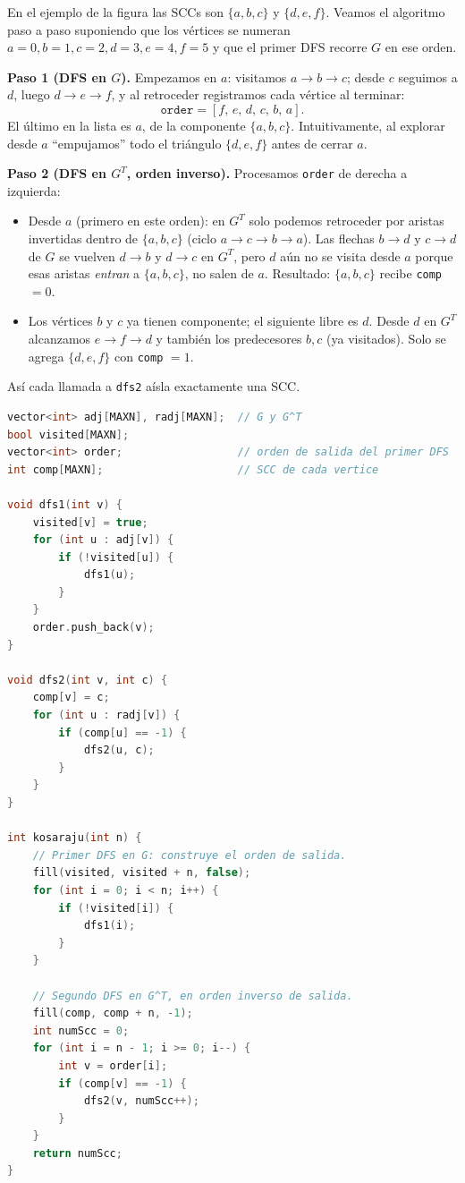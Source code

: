 En el ejemplo de la figura las SCCs son $\{a,b,c\}$ y $\{d,e,f\}$. Veamos el algoritmo paso a paso suponiendo que los vértices se numeran $a=0,b=1,c=2,d=3,e=4,f=5$ y que el primer DFS recorre $G$ en ese orden.

\textbf{Paso 1 (DFS en $G$).} Empezamos en $a$: visitamos $a \to b \to c$; desde $c$ seguimos a $d$, luego $d \to e \to f$, y al retroceder registramos cada vértice al terminar:
\[
\texttt{order} = [f,\, e,\, d,\, c,\, b,\, a].
\]
El último en la lista es $a$, de la componente $\{a,b,c\}$. Intuitivamente, al explorar desde $a$ ``empujamos'' todo el triángulo $\{d,e,f\}$ antes de cerrar $a$.

\textbf{Paso 2 (DFS en $G^T$, orden inverso).} Procesamos \texttt{order} de derecha a izquierda:
\begin{itemize}
    \item Desde $a$ (primero en este orden): en $G^T$ solo podemos retroceder por aristas invertidas dentro de $\{a,b,c\}$ (ciclo $a \to c \to b \to a$). Las flechas $b \to d$ y $c \to d$ de $G$ se vuelven $d \to b$ y $d \to c$ en $G^T$, pero $d$ aún no se visita desde $a$ porque esas aristas \emph{entran} a $\{a,b,c\}$, no salen de $a$. Resultado: $\{a,b,c\}$ recibe \texttt{comp} $= 0$.
    \item Los vértices $b$ y $c$ ya tienen componente; el siguiente libre es $d$. Desde $d$ en $G^T$ alcanzamos $e \to f \to d$ y también los predecesores $b,c$ (ya visitados). Solo se agrega $\{d,e,f\}$ con \texttt{comp} $= 1$.
\end{itemize}
Así cada llamada a \texttt{dfs2} aísla exactamente una SCC.
 
\begin{lstlisting}[language=C++]
vector<int> adj[MAXN], radj[MAXN];  // G y G^T
bool visited[MAXN];
vector<int> order;                  // orden de salida del primer DFS
int comp[MAXN];                     // SCC de cada vertice

void dfs1(int v) {
    visited[v] = true;
    for (int u : adj[v]) {
        if (!visited[u]) {
            dfs1(u);
        }
    }
    order.push_back(v);
}

void dfs2(int v, int c) {
    comp[v] = c;
    for (int u : radj[v]) {
        if (comp[u] == -1) {
            dfs2(u, c);
        }
    }
}

int kosaraju(int n) {
    // Primer DFS en G: construye el orden de salida.
    fill(visited, visited + n, false);
    for (int i = 0; i < n; i++) {
        if (!visited[i]) {
            dfs1(i);
        }
    }

    // Segundo DFS en G^T, en orden inverso de salida.
    fill(comp, comp + n, -1);
    int numScc = 0;
    for (int i = n - 1; i >= 0; i--) {
        int v = order[i];
        if (comp[v] == -1) {
            dfs2(v, numScc++);
        }
    }
    return numScc;
}
\end{lstlisting}
 
